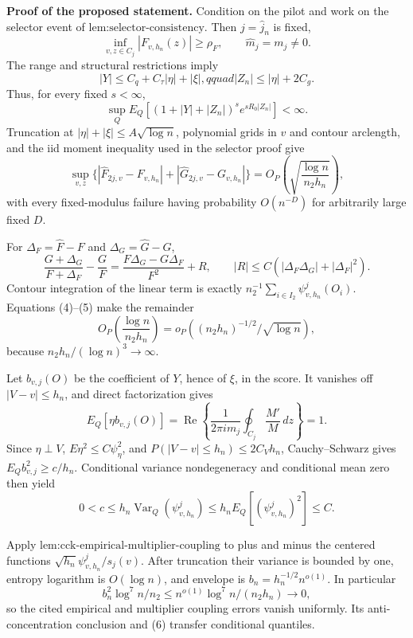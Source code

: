 \textbf{Proof of the proposed statement.}
Condition on the pilot and work on the selector event of \(\text{lem:selector-consistency}\).  Then \(j=\widehat j_n\) is fixed,
\[
 \inf_{v,z\in C_j}|F_{v,h_n}(z)|\ge\rho_F,
 \qquad \widehat m_j=m_j\ne0. \tag{1}
\]
The range and structural restrictions imply
\[
 |Y|\le C_q+C_\tau|\eta|+|\xi|,qquad |Z_n|\le|\eta|+2C_g. \tag{2}
\]
Thus, for every fixed \(s<\infty\),
\[
 \sup_QE_Q[(1+|Y|+|Z_n|)^se^{sR_0|Z_n|}]<\infty. \tag{3}
\]
Truncation at \(|\eta|+|\xi|\le A\sqrt{\log n}\), polynomial grids in \(v\) and contour arclength, and the iid moment inequality used in the selector proof give
\[
 \sup_{v,z}\{|\widehat F_{2j,v}-F_{v,h_n}|+|\widehat G_{2j,v}-G_{v,h_n}|\}
 =O_P\left(\sqrt{\frac{\log n}{n_2h_n}}\right), \tag{4}
\]
with every fixed-modulus failure having probability \(O(n^{-D})\) for arbitrarily large fixed \(D\).

For \(\Delta_F=\widehat F-F\) and \(\Delta_G=\widehat G-G\),
\[
 \frac{G+\Delta_G}{F+\Delta_F}-\frac GF
 =\frac{F\Delta_G-G\Delta_F}{F^2}+R,
 \qquad |R|\le C(|\Delta_F\Delta_G|+|\Delta_F|^2). \tag{5}
\]
Contour integration of the linear term is exactly \(n_2^{-1}\sum_{i\in I_2}\psi^j_{v,h_n}(O_i)\).  Equations (4)--(5) make the remainder
\[
 O_P\left(\frac{\log n}{n_2h_n}\right)
 =o_P\left((n_2h_n)^{-1/2}/\sqrt{\log n}\right), \tag{6}
\]
because \(n_2h_n/(\log n)^3\to\infty\).

Let \(b_{v,j}(O)\) be the coefficient of \(Y\), hence of \(\xi\), in the score.  It vanishes off \(|V-v|\le h_n\), and direct factorization gives
\[
 E_Q[\eta b_{v,j}(O)]
 =\operatorname{Re}\left\{\frac1{2\pi i m_j}\oint_{C_j}\frac{M'}M\,dz\right\}=1. \tag{7}
\]
Since \(\eta\perp V\), \(E\eta^2\le C\psi_\eta^2\), and \(P(|V-v|\le h_n)\le2C_Vh_n\), Cauchy--Schwarz gives \(E_Qb_{v,j}^2\ge c/h_n\).  Conditional variance nondegeneracy and conditional mean zero then yield
\[
 0<c\le h_n\operatorname{Var}_Q(\psi^j_{v,h_n})
 \le h_nE_Q[(\psi^j_{v,h_n})^2]\le C. \tag{8}
\]

Apply \(\text{lem:cck-empirical-multiplier-coupling}\) to plus and minus the centered functions \(\sqrt{h_n}\psi^j_{v,h_n}/s_j(v)\).  After truncation their variance is bounded by one, entropy logarithm is \(O(\log n)\), and envelope is \(b_n=h_n^{-1/2}n^{o(1)}\).  In particular
\[
 b_n^2\log^7n/n_2\le n^{o(1)}\log^7n/(n_2h_n)\to0, \tag{9}
\]
so the cited empirical and multiplier coupling errors vanish uniformly.  Its anti-concentration conclusion and (6) transfer conditional quantiles.

